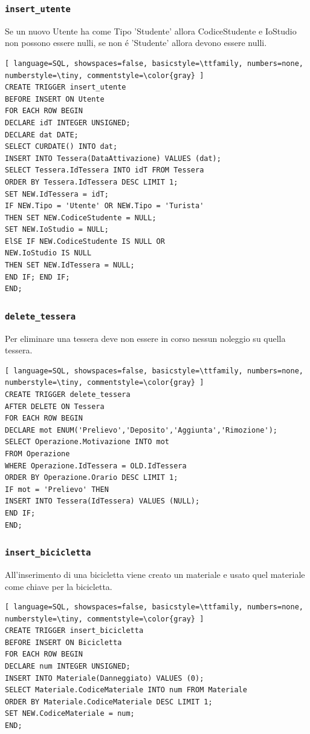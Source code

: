 \documentclass[a4paper,twoside]{article}
\begin{document}
\subsubsection{\texttt{insert\_utente}}
Se un nuovo Utente ha come Tipo 'Studente' allora CodiceStudente e IoStudio non possono essere nulli, se non é 'Studente' allora devono essere nulli.
\begin{lstlisting}[ language=SQL, showspaces=false, basicstyle=\ttfamily, numbers=none, numberstyle=\tiny, commentstyle=\color{gray} ]
CREATE TRIGGER insert_utente
BEFORE INSERT ON Utente
FOR EACH ROW BEGIN
DECLARE idT INTEGER UNSIGNED;
DECLARE dat DATE;
SELECT CURDATE() INTO dat;
INSERT INTO Tessera(DataAttivazione) VALUES (dat);
SELECT Tessera.IdTessera INTO idT FROM Tessera
ORDER BY Tessera.IdTessera DESC LIMIT 1;
SET NEW.IdTessera = idT;
IF NEW.Tipo = 'Utente' OR NEW.Tipo = 'Turista'
THEN SET NEW.CodiceStudente = NULL;
SET NEW.IoStudio = NULL;
ElSE IF NEW.CodiceStudente IS NULL OR
NEW.IoStudio IS NULL
THEN SET NEW.IdTessera = NULL;
END IF; END IF;
END;
\end{lstlisting}
\subsubsection{\texttt{delete\_tessera}}
Per eliminare una tessera deve non essere in corso nessun noleggio su quella tessera.
\begin{lstlisting}[ language=SQL, showspaces=false, basicstyle=\ttfamily, numbers=none, numberstyle=\tiny, commentstyle=\color{gray} ]
CREATE TRIGGER delete_tessera
AFTER DELETE ON Tessera
FOR EACH ROW BEGIN
DECLARE mot ENUM('Prelievo','Deposito','Aggiunta','Rimozione');
SELECT Operazione.Motivazione INTO mot
FROM Operazione
WHERE Operazione.IdTessera = OLD.IdTessera
ORDER BY Operazione.Orario DESC LIMIT 1;
IF mot = 'Prelievo' THEN
INSERT INTO Tessera(IdTessera) VALUES (NULL);
END IF;
END;
\end{lstlisting}
\subsubsection{\texttt{insert\_bicicletta}}
All'inserimento di una bicicletta viene creato un materiale e usato quel materiale come chiave per la bicicletta.
\begin{lstlisting}[ language=SQL, showspaces=false, basicstyle=\ttfamily, numbers=none, numberstyle=\tiny, commentstyle=\color{gray} ]
CREATE TRIGGER insert_bicicletta
BEFORE INSERT ON Bicicletta
FOR EACH ROW BEGIN
DECLARE num INTEGER UNSIGNED;
INSERT INTO Materiale(Danneggiato) VALUES (0);
SELECT Materiale.CodiceMateriale INTO num FROM Materiale
ORDER BY Materiale.CodiceMateriale DESC LIMIT 1;
SET NEW.CodiceMateriale = num;
END;
\end{lstlisting}
\end{document}
